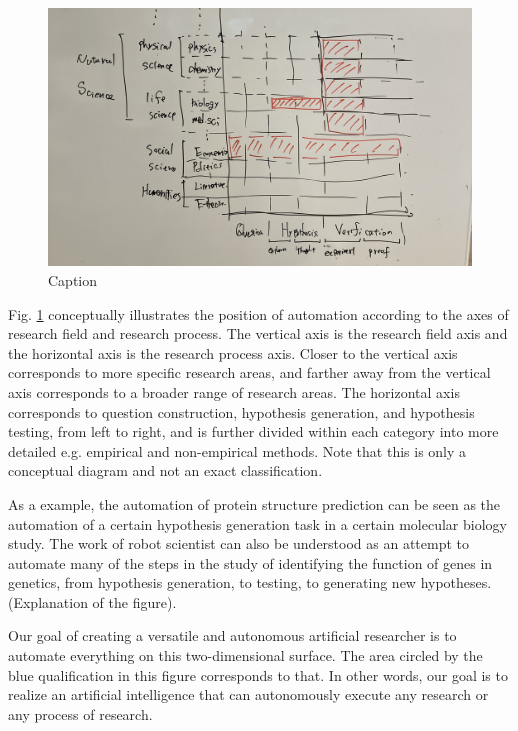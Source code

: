 \begin{figure}[htb]
    \centering
    \includegraphics[width=\linewidth]{figs/generality_matrix.jpg}
    \caption{Caption}
    \label{fig:generality_matrix}
\end{figure}

Fig. \ref{fig:generality_matrix} conceptually illustrates the position of automation according to the axes of research field and research process. The vertical axis is the research field axis and the horizontal axis is the research process axis. Closer to the vertical axis corresponds to more specific research areas, and farther away from the vertical axis corresponds to a broader range of research areas. The horizontal axis corresponds to question construction, hypothesis generation, and hypothesis testing, from left to right, and is further divided within each category into more detailed e.g. empirical and non-empirical methods. Note that this is only a conceptual diagram and not an exact classification.

As a example, the automation of protein structure prediction \cite{jumper2021highly} can be seen as the automation of a certain hypothesis generation task in a certain molecular biology study. The work of robot scientist \cite{king2004functional} can also be understood as an attempt to automate many of the steps in the study of identifying the function of genes in genetics, from hypothesis generation, to testing, to generating new hypotheses. (Explanation of the figure).

Our goal of creating a versatile and autonomous artificial researcher is to automate everything on this two-dimensional surface. The area circled by the blue qualification in this figure corresponds to that. In other words, our goal is to realize an artificial intelligence that can autonomously execute any research or any process of research.


